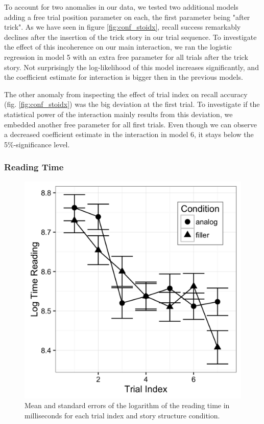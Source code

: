 \documentclass[a4paper,man,natbib,floatsintext,import]{apa6}
\begin{document}
\begin{landscape}

\end{landscape}

To account for two anomalies in our data, we tested two additional models adding a free trial position parameter on each, the first parameter being "after trick". As we have seen in figure \ref{fig:conf_stoidx}, recall success remarkably declines after the insertion of the trick story in our trial sequence. To investigate the effect of this incoherence on our main interaction, we ran the logistic regression in model 5 with an extra free parameter for all trials after the trick story. Not surprisingly the log-likelihood of this model increases significantly, and the coefficient estimate for interaction is bigger then in the previous models.

The other anomaly from inspecting the effect of trial index on recall accuracy (fig. \ref{fig:conf_stoidx}) was the big deviation at the first trial. To investigate if the statistical power of the interaction mainly results from this deviation, we embedded another free parameter for all first trials. Even though we can observe a decreased coefficient estimate in the interaction in model 6, it stays below the 5\%-significance level.


\subsubsection{Reading Time}

\begin{figure}
\centering
\begin{minipage}[t]{.5\textwidth}
\includegraphics[width=.9\linewidth]{figures/read.png}
\caption{Mean and standard errors of the logarithm of the reading time in milliseconds for each trial index and story structure condition.}
\label{fig:read}
\end{minipage}
\end{figure}
\end{document}
